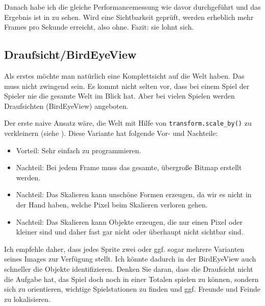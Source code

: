 Danach habe ich die gleiche Performancemessung wie davor durchgeführt und das Ergebnis ist in  zu sehen. Wird eine Sichtbarkeit geprüft, werden erheblich mehr Frames pro Sekunde erreicht, also ohne. Fazit: sie lohnt sich.



\subsection{Draufsicht/BirdEyeView}

Als erstes möchte man natürlich eine Komplettsicht auf die Welt haben. Das muss nicht zwingend sein. Es kommt nicht selten vor, dass bei einem Spiel der Spieler nie die gesamte Welt im Blick hat. Aber bei vielen Spielen werden Draufsichten (BirdEyeView) angeboten. 

Der erste naive Ansatz wäre, die Welt mit Hilfe von \texttt{transform.scale\_by()} zu verkleinern (siehe ). Diese Variante hat folgende Vor- und Nachteile:

\begin{itemize}
	\item Vorteil: Sehr einfach zu programmieren. 
	\item Nachteil: Bei jedem Frame muss das gesamte, übergroße Bitmap erstellt werden.	
	\item Nachteil: Das Skalieren kann unschöne Formen erzeugen, da wir es nicht in der Hand haben, welche Pixel beim Skalieren verloren gehen.
	\item Nachteil: Das Skalieren kann Objekte erzeugen, die nur einen Pixel oder kleiner sind und daher fast gar nicht oder überhaupt nicht sichtbar sind.
\end{itemize}



Ich empfehle daher, dass jedes Sprite zwei oder ggf. sogar mehrere Varianten seines Images zur Verfügung stellt. Ich könnte dadurch in der BirdEyeView auch schneller die Objekte identifizieren. Denken Sie daran, dass die Draufsicht nicht die Aufgabe hat, das Spiel doch noch in einer Totalen spielen zu können, sondern sich zu orientieren, wichtige Spielstationen zu finden und ggf. Freunde und Feinde zu lokalisieren.

